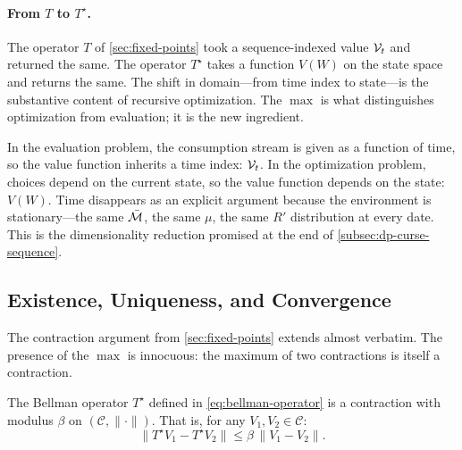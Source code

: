 \paragraph{From $T$ to $T^\star$.}
The operator $T$ of \cref{sec:fixed-points} took a sequence-indexed value $\mathcal{V}_t$ and returned the same. The operator $T^\star$ takes a function $V(W)$ on the state space and returns the same. The shift in domain---from time index to state---is the substantive content of recursive optimization. The $\max$ is what distinguishes optimization from evaluation; it is the new ingredient.

\begin{calloutnote}
In the evaluation problem, the consumption stream is given as a function of time, so the value function inherits a time index: $\mathcal{V}_t$. In the optimization problem, choices depend on the current state, so the value function depends on the state: $V(W)$. Time disappears as an explicit argument because the environment is stationary---the same $\bar{\mathcal{M}}$, the same $\mu$, the same $R'$ distribution at every date. This is the dimensionality reduction promised at the end of \cref{subsec:dp-curse-sequence}.
\end{calloutnote}

\subsection{Existence, Uniqueness, and Convergence}
\label{subsec:dp-existence}

The contraction argument from \cref{sec:fixed-points} extends almost verbatim. The presence of the $\max$ is innocuous: the maximum of two contractions is itself a contraction.

\begin{proposition}
\label{prop:bellman-contraction}
The Bellman operator $T^\star$ defined in \cref{eq:bellman-operator} is a contraction with modulus $\beta$ on $(\mathcal{C}, \|\cdot\|)$. That is, for any $V_1, V_2 \in \mathcal{C}$:
\begin{equation}
\|T^\star V_1 - T^\star V_2\| \leq \beta \, \|V_1 - V_2\|.
\label{eq:contraction-Tstar}
\end{equation}
\end{proposition}

